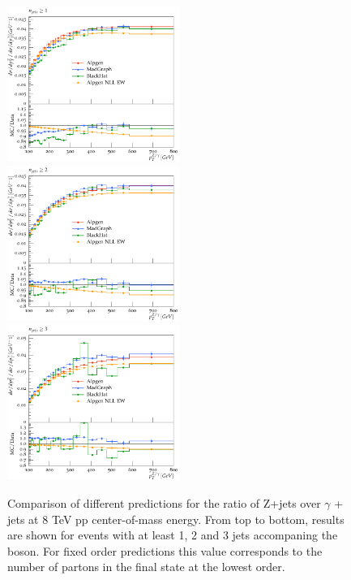 \documentclass[11pt]{cernrep} \usepackage{graphicx,epsfig} 
\begin{document}
\begin{figure}
\begin{center}
\includegraphics[width=0.5\textwidth]{d07-x01-y01-mc.pdf} \\
\includegraphics[width=0.5\textwidth]{d08-x01-y01-mc.pdf} \\
\includegraphics[width=0.5\textwidth]{d08-x02-y01-mc.pdf}
 \caption{Comparison of different predictions for the ratio of Z+jets over $\gamma$ + jets at 8 TeV pp
   center-of-mass energy. From top to bottom, results are shown for events with at least 1, 2 and 3 jets accompaning the
   boson. For fixed order predictions this value corresponds to the number of partons in the final state at the lowest order.}
\label{zgrmc}
\end{center}
\end{figure}
\end{document}

